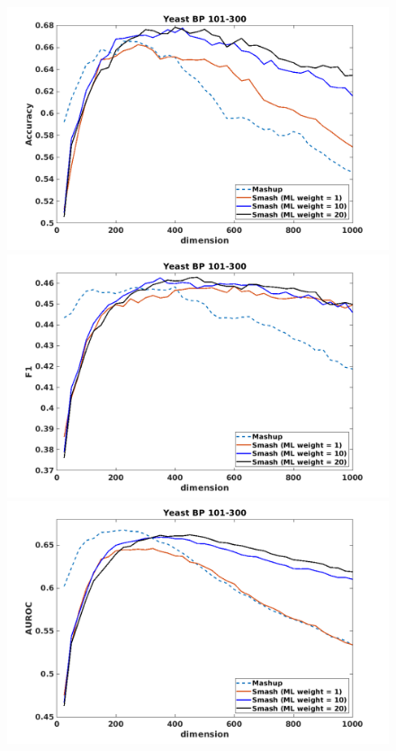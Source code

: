 \documentclass[12pt]{amsart}
\theoremstyle{remark}
\theoremstyle{definition}
\numberwithin{equation}{section} \numberwithin{table}{section}
\numberwithin{figure}{section}
\numberwithin{algorithm}{section}
\numberwithin{theorem}{section}
\begin{document}
\begin{figure}[h!]
	\centering
	\includegraphics[width=.8\linewidth]{Yeast-BP-101-300-Acc}  \\
	\includegraphics[width=.8\linewidth]{Yeast-BP-101-300-F1}  \\
	\includegraphics[width=.8\linewidth]{Yeast-BP-101-300-AUROC} 
\end{figure}
\end{document}
